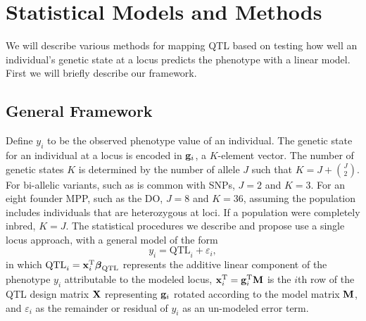 \section{Statistical Models and Methods}
We will describe various methods for mapping QTL based on testing how well an individual's genetic state at a locus predicts the phenotype with a linear model. First we will briefly describe our framework.

\subsection{General Framework}
Define $y_{i}$ to be the observed phenotype value of an individual. The genetic state for an individual at a locus is encoded in $\mathbf{g}_{i}$, a $K$-element vector. The number of genetic states $K$ is determined by the number of allele $J$ such that $K = J + \genfrac(){0pt}{2}{J}{2}$. For bi-allelic variants, such as is common with SNPs, $J = 2$ and $K = 3$. For an eight founder MPP, such as the DO, $J = 8$ and $K = 36$, assuming the population includes individuals that are heterozygous at loci. If a population were completely inbred, $K = J$. The statistical procedures we describe and propose use a single locus approach, with a general model of the form
\begin{equation*}
y_{i} = \text{QTL}_{i} + \varepsilon_{i},
\end{equation*}
in which $\text{QTL}_{i} = \mathbf{x}_{i}^{\text{T}}\boldsymbol{\beta}_{\text{QTL}}$ represents the additive linear component of the phenotype $y_{i}$ attributable to the modeled locus, $\mathbf{x}_{i}^{\text{T}} = \mathbf{g}_{i}^{\text{T}}\mathbf{M}$ is the $i$th row of the QTL design matrix $\mathbf{X}$ representing $\mathbf{g}_{i}$ rotated according to the model matrix $\mathbf{M}$, and $\varepsilon_{i}$ as the remainder or residual of $y_{i}$ as an un-modeled error term. 

